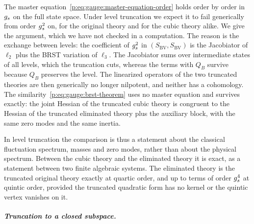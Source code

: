 The master equation~\eqref{p:eq:gauge:master-equation-order} holds order by order in $g_s$ on the full state space.
Under level truncation we expect it to fail generically from order $g_s^2$ on, for the original theory and for the cubic theory alike.
We give the argument, which we have not checked in a computation.
The reason is the exchange between levels: the coefficient of $g_s^2$ in $(S_{\mathrm{BV}}, S_{\mathrm{BV}})$ is the Jacobiator of $\ell_2$ plus the BRST variation of $\ell_3$.
The Jacobiator sums over intermediate states of all levels, which the truncation cuts, whereas the terms with $Q_B$ survive because $Q_B$ preserves the level.
The linearized operators of the two truncated theories are then generically no longer nilpotent, and neither has a cohomology.
The similarity~\eqref{p:eq:gauge:brst-theorem} uses no master equation and survives exactly: the joint Hessian of the truncated cubic theory is congruent to the Hessian of the truncated eliminated theory plus the auxiliary block, with the same zero modes and the same inertia.

In level truncation the comparison is thus a statement about the classical fluctuation spectrum, masses and zero modes, rather than about the physical spectrum.
Between the cubic theory and the eliminated theory it is exact, as a statement between two finite algebraic systems.
The eliminated theory is the truncated original theory exactly at quartic order, and up to terms of order $g_s^4$ at quintic order, provided the truncated quadratic form has no kernel or the quintic vertex vanishes on it.

\subparagraph{Truncation to a closed subspace.}

